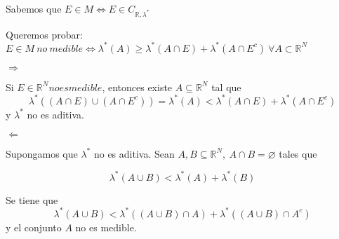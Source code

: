 
 
Sabemos que $E\in M \Longleftrightarrow E \in C_{\mathbb{R}, \lambda^*}$

Queremos probar:
$E \in M \ no \ medible \Longleftrightarrow \lambda^*(A) \geq \lambda^*(A\cap E) + \lambda^*(A \cap E^c) \ \forall A\subset \mathbb{R}^N$

$\Longrightarrow$

Si $E \in \mathbb{R}^N no es medible$, entonces existe $A\subseteq \mathbb{R}^N$ tal que 
\[\lambda^*( (A\cap E) \cup (A\cap E^c) ) = \lambda^*(A) < \lambda^*(A\cap E) + \lambda^*(A\cap E^c)\]
y $\lambda^*$ no es aditiva.

$\Longleftarrow$

Supongamos que $\lambda^*$ no es aditiva. Sean $A,B\subseteq \mathbb{R}^N, \ A\cap B = \varnothing$ tales que

\[\lambda^*(A\cup B) < \lambda^*(A) + \lambda^*(B)\]

Se tiene que
\[ \lambda^*(A\cup B) < \lambda^*( (A\cup B)\cap A ) + \lambda^*( (A\cup B)\cap A^c )\]
y el conjunto $A$ no es medible.